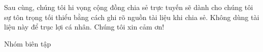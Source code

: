 \documentclass[12pt,twoside]{article}
\begin{document}
\hspace{10mm} Sau cùng, chúng tôi hi vọng cộng đồng chia sẻ trực tuyến sẽ dành cho chúng tôi sự tôn trọng tối thiểu bằng cách ghi rõ nguồn tài liệu khi chia sẻ. Không dùng tài liệu này để trục lợi cá nhân. Chúng tôi xin cảm ơn!
\vspace{5mm}

\hspace{12cm} Nhóm biên tập



%
%
%
%

\newpage

%
%
%
\end{document}

